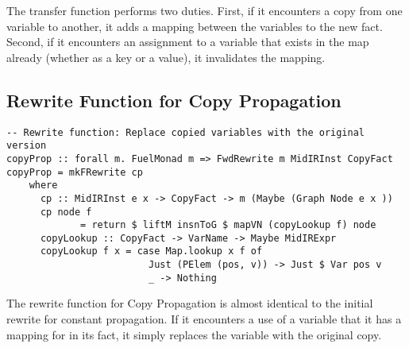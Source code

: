 \documentclass[11pt]{article}
\begin{document}
The transfer function performs two duties. First, if it encounters a copy from one variable to another, it adds a mapping between the variables to the new fact. Second, if it encounters an assignment to a variable that exists in the map already (whether as a key or a value), it invalidates the mapping. 

\subsection { Rewrite Function for Copy Propagation }

\begin{verbatim}
-- Rewrite function: Replace copied variables with the original version 
copyProp :: forall m. FuelMonad m => FwdRewrite m MidIRInst CopyFact 
copyProp = mkFRewrite cp 
    where 
      cp :: MidIRInst e x -> CopyFact -> m (Maybe (Graph Node e x ))
      cp node f 
             = return $ liftM insnToG $ mapVN (copyLookup f) node 
      copyLookup :: CopyFact -> VarName -> Maybe MidIRExpr 
      copyLookup f x = case Map.lookup x f of 
                         Just (PElem (pos, v)) -> Just $ Var pos v 
                         _ -> Nothing
\end{verbatim}

The rewrite function for Copy Propagation is almost identical to the initial rewrite for constant propagation. If it encounters a use of a variable that it has a mapping for in its fact, it simply replaces the variable with the original copy. 
\end{document}

